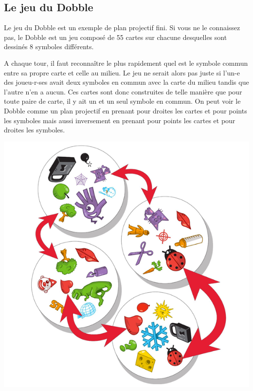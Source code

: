 \documentclass[a4paper]{article}
\begin{document}
\subsection{Le jeu du Dobble}
Le jeu du Dobble est un exemple de plan projectif fini. Si vous ne le connaissez pas, le Dobble est un jeu composé de 55 cartes sur chacune desquelles sont dessinés 8 symboles\vspace{1\baselineskip} différents.\\
  \begin{minipage}{0.55\linewidth}
A chaque tour, il faut reconnaître le plus rapidement quel est le symbole commun entre sa propre carte et celle au milieu. Le jeu ne serait alors pas juste si l'un-e des joueu-r-ses avait deux symboles en commun avec la carte du milieu tandis que l'autre n'en a aucun.
  Ces cartes sont donc construites de telle manière que pour toute paire de carte, il y ait un et un seul symbole en commun. On peut voir le Dobble comme un plan projectif en prenant pour droites les cartes et pour points les symboles mais aussi inversement en prenant pour points les cartes et pour droites les symboles.\vspace{1\baselineskip}\\
\end{minipage}\hfill
\begin{minipage}{0.55\linewidth}
\begin{center}
\includegraphics[scale=0.3]{dobble-2.jpg}
\end{center}
\end{minipage}
\end{document}
